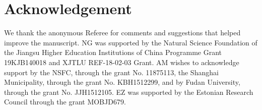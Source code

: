 \documentclass[aps,nofootinbib,amsfonts,superscriptaddress]{revtex4}
\begin{document}

\section*{Acknowledgement} 
 We thank the anonymous Referee for comments and suggestions that helped improve the manuscript. 
NG was supported by the Natural Science Foundation of the Jiangsu Higher Education Institutions of China Programme Grant 19KJB140018 and XJTLU REF-18-02-03 Grant. AM wishes to acknowledge support by the NSFC, through the grant No. 11875113, the Shanghai Municipality, through the grant No. KBH1512299, and by Fudan University, through the grant No. JJH1512105. EZ was supported by the Estonian Research Council through the grant MOBJD679. 
\end{document}
